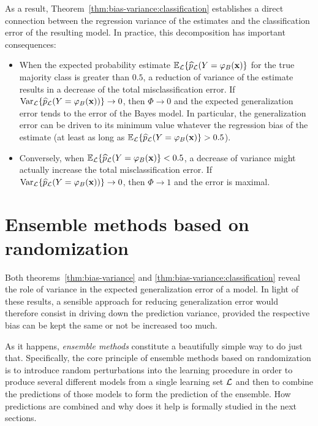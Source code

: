 As a result, Theorem~\ref{thm:bias-variance:classification} establishes a
direct connection between the regression variance of the estimates and the
classification error of the resulting model. In practice, this decomposition
has important consequences:
\begin{itemize}
\item When the expected probability estimate $\mathbb{E}_{\cal L}\{ \widehat{p}_{\cal L}(Y=\varphi_B(\mathbf{x}) \}$
      for the true majority class is greater than $0.5$, a reduction of
      variance of the estimate results in a decrease of the total misclassification
      error. If $\text{Var}_{\cal L}\{ \widehat{p}_{\cal L}(Y=\varphi_B(\mathbf{x})) \} \to 0$,
      then $\Phi \to 0$ and the expected generalization error tends to the error of the Bayes model.
      In particular, the generalization error can be driven to its minimum
      value whatever the regression bias of the estimate (at least as long as $\mathbb{E}_{\cal L}\{ \widehat{p}_{\cal L}(Y=\varphi_B(\mathbf{x}) \} > 0.5$).
\item Conversely, when $\mathbb{E}_{\cal L}\{ \widehat{p}_{\cal L}(Y=\varphi_B(\mathbf{x}) \} < 0.5$,
      a decrease of variance might actually increase the total misclassification error.
      If $\text{Var}_{\cal L}\{ \widehat{p}_{\cal L}(Y=\varphi_B(\mathbf{x})) \} \to 0$,
      then $\Phi \to 1$ and the error is maximal.
\end{itemize}


\section{Ensemble methods based on randomization}
\label{sec:4:ensemble}

Both theorems~\ref{thm:bias-variance} and \ref{thm:bias-variance:classification}
reveal the role of variance in the expected generalization error of a model. In
light of these results, a sensible approach for reducing generalization error
would therefore consist in driving down the prediction variance, provided the
respective bias can be kept the same or not be increased too much.

As it happens, \textit{ensemble methods} constitute a beautifully simple way to
do just that. Specifically, the core principle of ensemble methods based on randomization is to
introduce random perturbations into the learning procedure in order to produce
several different models from a single learning set ${\cal L}$ and then to
combine the predictions of those models to form the prediction of the ensemble.
How predictions are combined and why does it help is formally studied in the
next sections.


